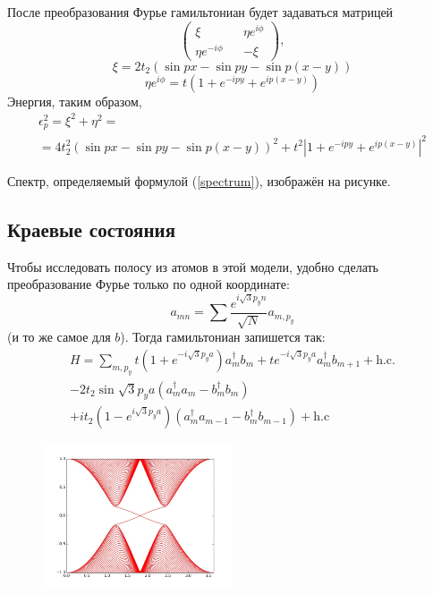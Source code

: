	После преобразования Фурье гамильтониан будет задаваться матрицей
	\begin{equation}
		\left(
		\begin{matrix}
			\xi && \eta e^{i\phi} \\
			\eta e^{-i\phi} && -\xi
		\end{matrix}
		\right),
	\end{equation}
	\begin{equation}
		\xi = 2t_2 (\sin{px} - \sin{py} - \sin{p(x-y)}) 
	\end{equation}
	\begin{equation}
		\eta e^{i\phi} = t(1 + e^{-ipy} + e^{ip(x-y)}) 
	\end{equation}
	Энергия, таким образом,
	\begin{multline}
		\epsilon_p^2 = \xi^2 + \eta^2 =\\
			= 4t_2^2(\sin{px} - \sin{py} - \sin{p(x-y)})^2 + 
					t^2 |1 + e^{-ipy} + e^{ip(x-y)}|^2
		\label{spectrum}
	\end{multline}
	
	Спектр, определяемый формулой (\ref{spectrum}), изображён на рисунке. 

	\subsection{Краевые состояния}
	Чтобы исследовать полосу из атомов в этой модели, удобно сделать преобразование Фурье
	только по одной координате:
	\begin{equation}
		a_{mn} = \sum \frac{e^{i\sqrt{3}p_yn}}{\sqrt{N}} a_{m,p_y}
	\end{equation}
	(и то же самое для $b$). Тогда гамильтониан запишется так:
	\begin{multline}
		H = \sum_{m, p_y} t(1+e^{-i\sqrt{3}p_ya}) a_m^\dagger b_m
		 + te^{-i\sqrt{3}p_ya} a_m^\dagger b_{m+1} + \mbox{h.c.} \\
		- 2t_2 \sin{\sqrt{3} p_ya} (a_m^\dagger a_m -  b_m^\dagger b_m)\\
		+ it_2(1 - e^{i\sqrt{3}p_ya}) (a_m^\dagger a_{m-1} - b_m^\dagger b_{m-1}) 
		+ \mbox{h.c}
	\end{multline}

	\begin{figure}[h]
		\begin{center}	
			\includegraphics[width=0.5\textwidth]{levels.jpg}
		\end{center}
	\end{figure}

